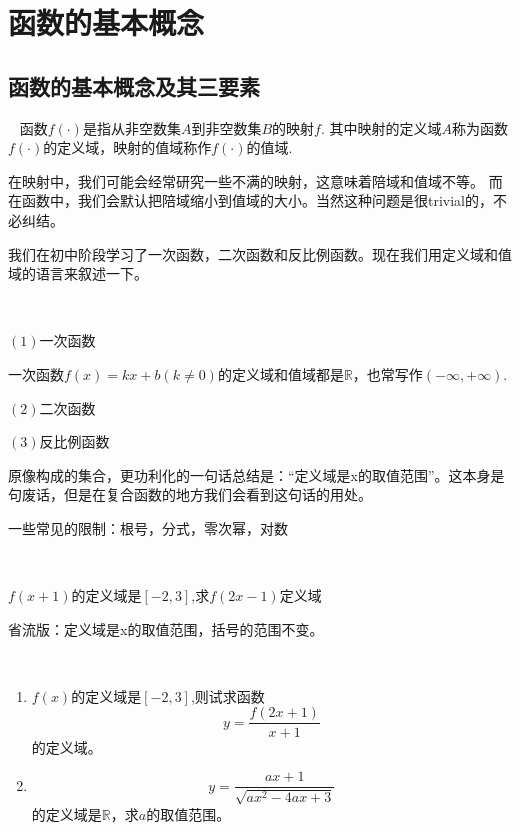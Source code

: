 
\section{函数的基本概念}
\subsection{函数的基本概念及其三要素}

\begin{definition}[函数，定义域，值域]
    \ 
    函数$f(\cdot)$是指从非空数集$A$到非空数集$B$的映射$f$.
    其中映射的定义域$A$称为函数$f(\cdot)$的定义域，映射的值域称作$f(\cdot)$的值域.
\end{definition}
\begin{zhu}
    在映射中，我们可能会经常研究一些不满的映射，这意味着陪域和值域不等。
    而在函数中，我们会默认把陪域缩小到值域的大小。当然这种问题是很trivial的，不必纠结。
\end{zhu}
我们在初中阶段学习了一次函数，二次函数和反比例函数。现在我们用定义域和值域的语言来叙述一下。
\begin{example}
    \ 

    $(1)$一次函数

    一次函数$f(x)=kx+b(k\neq0)$的定义域和值域都是$\mathbb{R}$，也常写作$(-\infty,+\infty)$.
    
    $(2)$二次函数

    $(3)$反比例函数
\end{example}
原像构成的集合，更功利化的一句话总结是：“定义域是x的取值范围”。这本身是句废话，但是在复合函数的地方我们会看到这句话的用处。

一些常见的限制：根号，分式，零次幂，对数
\begin{definition}[复合函数]
\end{definition}
\begin{example}
    \ 

    $f(x+1)$的定义域是$[-2,3]$,求$f(2x-1)$定义域
\end{example}

省流版：定义域是x的取值范围，括号的范围不变。
\begin{exercise}
    \ 

    \begin{enumerate}
        \item  $f(x)$的定义域是$[-2,3]$,则试求函数\[y=\frac{f(2x+1)}{x+1}\]的定义域。
       \item \[y=\frac{ax+1}{\sqrt{ax^2-4ax+3}}\]的定义域是$\mathbb{R}$，求$a$的取值范围。
    \end{enumerate}
   
\end{exercise}




